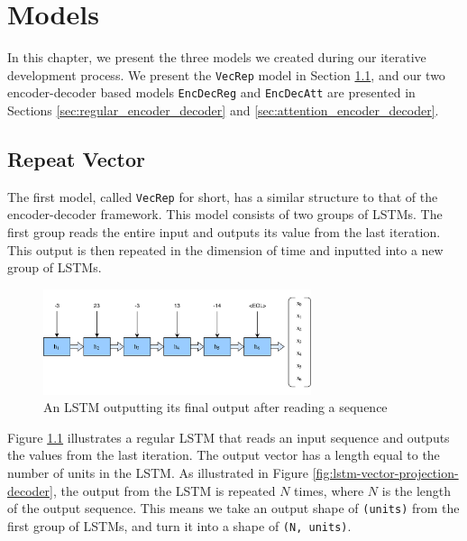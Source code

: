 
\chapter{Models}
\label{ch:models}
In this chapter, we present the three models we created during our iterative development process. We present the {\tt VecRep} model in Section \ref{sec:repeat_vector}, and our two encoder-decoder based models {\tt EncDecReg} and {\tt EncDecAtt} are presented in Sections \ref{sec:regular_encoder_decoder} and \ref{sec:attention_encoder_decoder}.


\section{Repeat Vector}
\label{sec:repeat_vector}
The first model, called {\tt VecRep} for short, has a similar structure to that of the encoder-decoder framework. This model consists of two groups of LSTMs. The first group reads the entire input and outputs its value from the last iteration. This output is then repeated in the dimension of time and inputted into a new group of LSTMs.

\begin{figure}[ht]
    \centering
    \includegraphics[width=0.7\textwidth]{fig/development_process/lstm-vector-projection-encoder.png}
    \caption{An LSTM outputting its final output after reading a sequence}
    \label{fig:lstm-vector-projection-encoder}
\end{figure}

Figure \ref{fig:lstm-vector-projection-encoder} illustrates a regular LSTM that reads an input sequence and outputs the values from the last iteration. The output vector has a length equal to the number of units in the LSTM. As illustrated in Figure \ref{fig:lstm-vector-projection-decoder}, the output from the LSTM is repeated \(N\) times, where \(N\) is the length of the output sequence. This means we take an output shape of {\tt (units)} from the first group of LSTMs, and turn it into a shape of {\tt (N, units)}.

